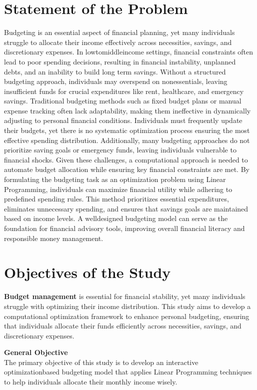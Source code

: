 \documentclass{article}
\begin{document}
\section{Statement of the Problem}
Budgeting is an essential aspect of financial planning, yet many individuals struggle to allocate their income effectively across necessities, savings, and discretionary expenses. In lowtomiddleincome settings, financial constraints often lead to poor spending decisions, resulting in financial instability, unplanned debts, and an inability to build long term savings. Without a structured budgeting approach, individuals may overspend on nonessentials, leaving insufficient funds for crucial expenditures like rent, healthcare, and emergency savings.
Traditional budgeting methods such as fixed budget plans or manual expense tracking often lack adaptability, making them ineffective in dynamically adjusting to personal financial conditions. Individuals must frequently update their budgets, yet there is no systematic optimization process ensuring the most effective spending distribution. Additionally, many budgeting approaches do not prioritize saving goals or emergency funds, leaving individuals vulnerable to financial shocks.
Given these challenges, a computational approach is needed to automate budget allocation while ensuring key financial constraints are met. By formulating the budgeting task as an optimization problem using Linear Programming, individuals can maximize financial utility while adhering to predefined spending rules. This method prioritizes essential expenditures, eliminates unnecessary spending, and ensures that savings goals are maintained based on income levels. A welldesigned budgeting model can serve as the foundation for financial advisory tools, improving overall financial literacy and responsible money management.

\section{Objectives of the Study}
\textbf{Budget management} is essential for financial stability, yet many individuals struggle with optimizing their income distribution. This study aims to develop a computational optimization framework to enhance personal budgeting, ensuring that individuals allocate their funds efficiently across necessities, savings, and discretionary expenses.

\textbf{General Objective} \\
The primary objective of this study is to develop an interactive optimizationbased budgeting model that applies Linear Programming techniques to help individuals allocate their monthly income wisely.
\end{document}
